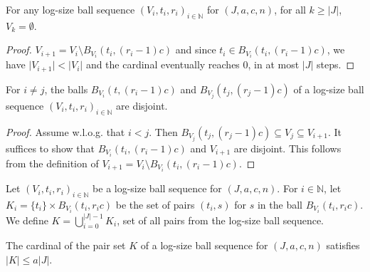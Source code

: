 \begin{lemma}\label{lem:logSizeBallSequence_eq_zero}
  \leanok
For any log-size ball sequence $(V_i, t_i, r_i)_{i \in \mathbb{N}}$ for $(J, a, c, n)$, for all $k \ge \vert J \vert$, $V_k = \emptyset$.
\end{lemma}

\begin{proof}
  \leanok
$V_{i+1} = V_i \setminus B_{V_i}(t_i, (r_i - 1)c)$ and since $t_i \in B_{V_i}(t_i, (r_i - 1)c)$, we have $\vert V_{i+1} \vert < \vert V_i \vert$ and the cardinal eventually reaches $0$, in at most $\vert J \vert$ steps.
\end{proof}


\begin{lemma}\label{lem:logSizeBallSequence_disjoint_B}
  \leanok
For $i \ne j$, the balls $B_{V_i}(t, (r_i-1)c)$ and $B_{V_j}(t_j, (r_j-1)c)$ of a log-size ball sequence $(V_i, t_i, r_i)_{i \in \mathbb{N}}$ are disjoint.
\end{lemma}

\begin{proof}
  \leanok
Assume w.l.o.g. that $i < j$.
Then $B_{V_j}(t_j, (r_j-1)c) \subseteq V_j \subseteq V_{i+1}$.
It suffices to show that $B_{V_i}(t_i, (r_i-1)c)$ and $V_{i+1}$ are disjoint.
This follows from the definition of $V_{i+1} = V_i \setminus B_{V_i}(t_i, (r_i-1)c)$.
\end{proof}


\begin{definition}\label{def:pairSet}
  \leanok
Let $(V_i, t_i, r_i)_{i \in \mathbb{N}}$ be a log-size ball sequence for $(J, a, c, n)$.
For $i \in \mathbb{N}$, let $K_i = \{t_i\} \times B_{V_i}(t_i, r_i c)$ be the set of pairs $(t_i, s)$ for $s$ in the ball $B_{V_i}(t_i, r_i c)$.
We define $K = \bigcup_{i=0}^{\vert J \vert-1} K_i$, set of all pairs from the log-size ball sequence.
\end{definition}


\begin{lemma}\label{lem:card_pairSet_le}
  \leanok
The cardinal of the pair set $K$ of a log-size ball sequence for $(J, a, c, n)$ satisfies $|K| \le a |J|$.
\end{lemma}

